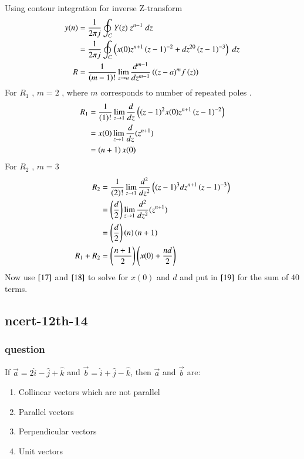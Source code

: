 \documentclass[journal,12pt,onecolumn]{IEEEtran}
\theoremstyle{remark}
\begin{document}
Using contour integration for inverse Z-transform
\begin{align}
    y(n)&=\frac{1}{2\pi j}\oint_{C}Y(z) \;z^{n-1} \;dz\\  
 &=\frac{1}{2\pi j}\oint_{C}\left(x(0)z^{n+1}\left(z-1\right)^{-2}+
       dz^{20}\left(z-1\right)^{-3}\right) \;dz\\
       R&=\frac{1}{\left(m-1\right)!}\lim\limits_{z\to a}\frac{d^{m-1}}{dz^{m-1}}\left({(z-a)}^{m}f\left(z\right)\right)\label{eq:6}  
\end{align}
For $R_1$ , $m=2$ , where $m$ corresponds to number of repeated poles .
\begin{align}
    R_1 &=\frac{1}{\left(1\right)!}\lim\limits_{z\to 1}\frac{d}{dz}\left({(z-1)}^{2}x(0)z^{n+1}\left(z-1\right)^{-2}\right)   \\
    &=x(0)\lim\limits_{z\to 1}\frac{d}{dz}(z^{n+1})   \\
    &= \left(n+1\right)x(0)
    \end{align}
    For $R_2$ , $m=3$ 
    \begin{align}
    R_2 &=\frac{1}{\left(2\right)!}\lim\limits_{z\to 1}\frac{d^{2}}{dz^{2}}\left({(z-1)}^{3}dz^{n+1}\left(z-1\right)^{-3}\right)   \\
        &=\left(\frac{d}{2}\right)\lim\limits_{z\to 1}\frac{d^2}{dz^2}(z^{n+1})   \\
    &= \left(\frac{d}{2}\right)\left(n\right)\left(n+1\right)\\
    R_1 + R_2 &= \left(\frac{n+1}{2}\right)\left(x(0) + \frac{nd}{2}\right) \label{19}\\
\end{align}
Now use $\eqref{17}$ and $\eqref{18}$ to solve for $x(0)$ and $d$ and put in $\eqref{19}$ for the sum of $40$ terms.


\subsection{ncert-12th-14}
\subsubsection{question}
If $\overrightarrow{a} = 2\hat{i} - \hat{j} + \hat{k}$ and  $\overrightarrow{b} = \hat{i} + \hat{j} - \hat{k}$, then $\overrightarrow{a}$ and $\overrightarrow{b}$ are:
    \begin{enumerate}
\item Collinear vectors which are not parallel
\item Parallel vectors
\item Perpendicular vectors
\item Unit vectors
\end{enumerate}
\end{document}
